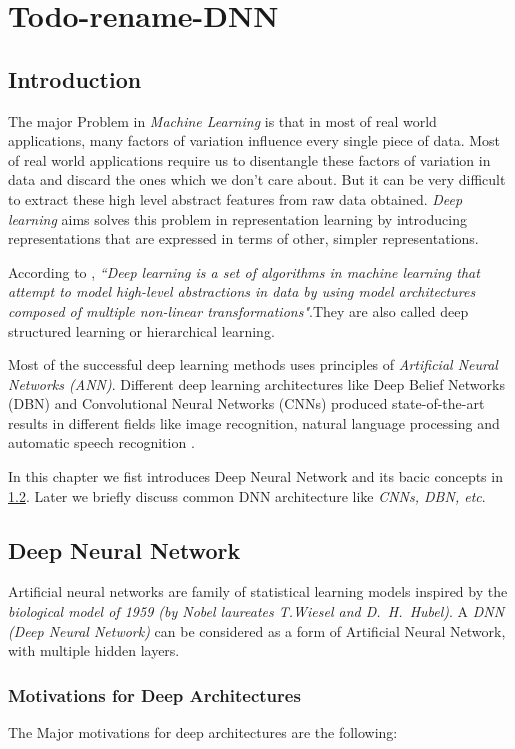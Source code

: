 \chapter{Todo-rename-DNN}
\label{chap:dnn}
\section{Introduction}
The major Problem in \textit{Machine Learning} is that in most of real world applications, many factors of variation influence every single piece of data. Most of real world applications require us to disentangle these factors of variation in data and discard the ones which we don't care about. But it can be very difficult to extract these high level abstract features from raw data obtained. \textit{Deep learning} aims solves this problem in representation learning by introducing representations that are expressed in terms of other, simpler representations.

According to \cite{deng2014deep}, \textit{``Deep learning is a set of algorithms in machine learning that attempt to model high-level abstractions in data by using model architectures composed of multiple non-linear transformations"}.They are also called deep structured learning or hierarchical learning. 

Most of the successful deep learning methods uses principles of \textit{Artificial Neural Networks (ANN)}. Different deep learning architectures like  Deep Belief Networks (DBN) and Convolutional Neural Networks (CNNs) produced state-of-the-art results in different fields like image recognition, natural language processing and automatic speech recognition .

In this chapter we fist introduces Deep Neural Network and its bacic concepts in \ref{sec:dnn:dnn}. Later we briefly discuss common DNN architecture like \textit{CNNs, DBN, etc}.

\section{Deep Neural Network}
\label{sec:dnn:dnn}
Artificial neural networks are family of statistical learning models inspired by the \textit{biological model of 1959 (by Nobel laureates T.Wiesel and D.~H.~Hubel)}. A \textit{DNN (Deep Neural Network)} can be considered as a form of  Artificial Neural Network, with multiple hidden layers. 


\subsection{Motivations for Deep Architectures}
The Major motivations for deep architectures are the following:

